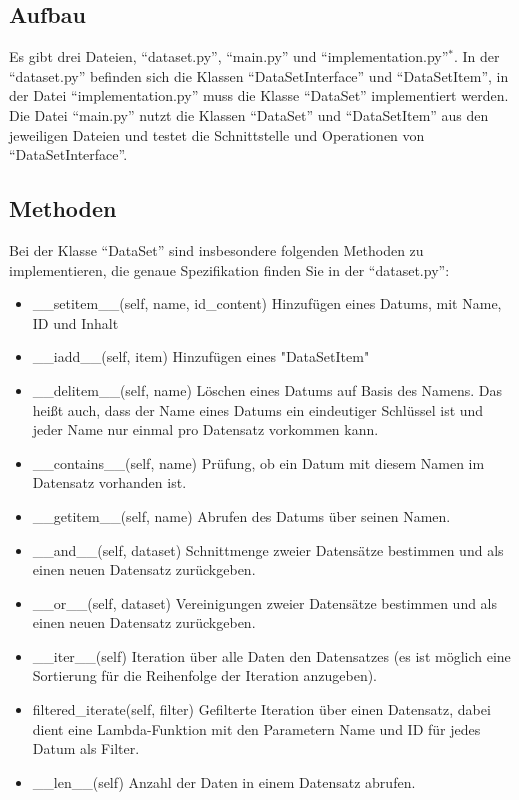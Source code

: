 \documentclass[]{article}
\begin{document}
    \subsection{Aufbau}
        Es gibt drei Dateien, ``dataset.py'', ``main.py'' und ``implementation.py''$^*$.
        In der ``dataset.py'' befinden sich die Klassen ``DataSetInterface'' und ``DataSetItem'',
        in der Datei ``implementation.py'' muss die Klasse ``DataSet'' implementiert werden.
        Die Datei ``main.py'' nutzt die Klassen ``DataSet'' und ``DataSetItem'' aus den jeweiligen Dateien und testet die Schnittstelle und Operationen von ``DataSetInterface''.\\
    
    \subsection{Methoden}
        Bei der Klasse ``DataSet'' sind insbesondere folgenden Methoden zu implementieren, die genaue Spezifikation finden Sie in der ``dataset.py'':\\
        \begin{itemize}
            \item \_\_setitem\_\_(self, name, id\_content) Hinzufügen eines Datums, mit Name, ID und Inhalt
            \item  \_\_iadd\_\_(self, item) Hinzufügen eines "DataSetItem"
            \item \_\_delitem\_\_(self, name) Löschen eines Datums auf Basis des Namens. Das heißt auch, dass der Name eines Datums ein eindeutiger Schlüssel ist und jeder Name nur einmal pro Datensatz vorkommen kann.
            \item \_\_contains\_\_(self, name) Prüfung, ob ein Datum mit diesem Namen im Datensatz vorhanden ist.
            \item \_\_getitem\_\_(self, name) Abrufen des Datums über seinen Namen.
            \item \_\_and\_\_(self, dataset) Schnittmenge zweier Datensätze bestimmen und als einen neuen Datensatz zurückgeben.
            \item \_\_or\_\_(self, dataset)  Vereinigungen zweier Datensätze bestimmen und als einen neuen Datensatz zurückgeben.
            \item \_\_iter\_\_(self) Iteration über alle Daten den Datensatzes (es ist möglich eine Sortierung für die Reihenfolge der Iteration anzugeben).
            \item filtered\_iterate(self, filter) Gefilterte Iteration über einen Datensatz, dabei dient eine Lambda-Funktion mit den Parametern Name und ID für jedes Datum als Filter.
            \item \_\_len\_\_(self) Anzahl der Daten in einem Datensatz abrufen.\\    
        \end{itemize}
\end{document}
